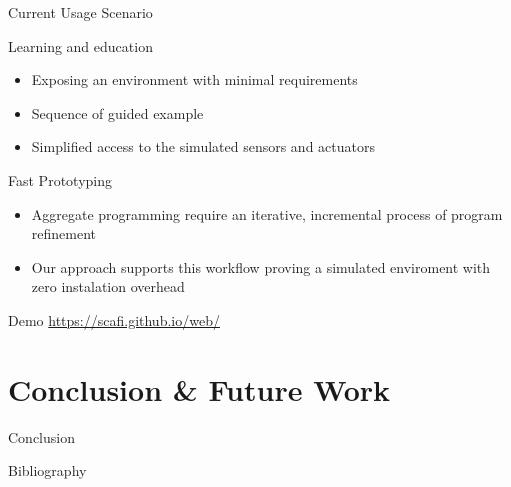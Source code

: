 \documentclass[presentation]{beamer}
\begin{document}
\begin{frame}[fragile]{Current Usage Scenario}


\begin{block}{Learning and education}
  \begin{itemize}
  \item Exposing an environment with minimal requirements
  \item Sequence of guided example
  \item Simplified access to the simulated sensors and actuators
  \end{itemize}
\end{block}

\begin{block}{Fast Prototyping}
  \begin{itemize}
  \item Aggregate programming require an iterative, incremental process of program refinement
  \item Our approach supports this workflow proving a simulated enviroment with zero instalation overhead
  \end{itemize}
  
\end{block}

\end{frame}

\begin{frame}[fragile]{Demo}
  \centering
  \url{https://scafi.github.io/web/}

\end{frame}
  
\section{Conclusion \& Future Work}

\begin{frame}{Conclusion}

%

\end{frame}

\begin{frame}[allowframebreaks]{Bibliography}
\def\bibfont{\footnotesize}
\printbibliography
\end{frame}
\end{document}
